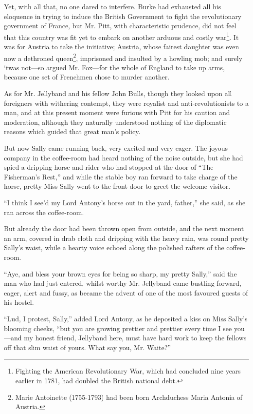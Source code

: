 \documentclass[paper=a5,BCOR=7mm,twoside,DIV=calc,12pt,usegeometry,chapterprefix,endperiod,headings=big]{scrbook}
\begin{document}
Yet, with all that, no one dared to interfere. Burke had exhausted all his eloquence in trying to induce the British Government to fight the revolutionary government of France, but Mr. Pitt, with characteristic prudence, did not feel that this country was fit yet to embark on another arduous and costly war\footnote{Fighting the American Revolutionary War, which had concluded nine years earlier in 1781, had doubled the British national debt.}. It was for Austria to take the initiative; Austria, whose fairest daughter was even now a dethroned queen\footnote{Marie Antoinette (1755-1793) had been born Archduchess Maria Antonia of Austria.}, imprisoned and insulted by a howling mob; and surely `twas not---so argued Mr. Fox---for the whole of England to take up arms, because one set of Frenchmen chose to murder another.

As for Mr. Jellyband and his fellow John Bulls, though they looked upon all foreigners with withering contempt, they were royalist and anti-revolutionists to a man, and at this present moment were furious with Pitt for his caution and moderation, although they naturally understood nothing of the diplomatic reasons which guided that great man's policy.

But now Sally came running back, very excited and very eager. The joyous company in the coffee-room had heard nothing of the noise outside, but she had spied a dripping horse and rider who had stopped at the door of \enquote{The Fisherman's Rest,} and while the stable boy ran forward to take charge of the horse, pretty Miss Sally went to the front door to greet the welcome visitor.

\enquote{I think I see'd my Lord Antony's horse out in the yard, father,} she said, as she ran across the coffee-room.

But already the door had been thrown open from outside, and the next moment an arm, covered in drab cloth and dripping with the heavy rain, was round pretty Sally's waist, while a hearty voice echoed along the polished rafters of the coffee-room.

\enquote{Aye, and bless your brown eyes for being so sharp, my pretty Sally,} said the man who had just entered, whilst worthy Mr. Jellyband came bustling forward, eager, alert and fussy, as became the advent of one of the most favoured guests of his hostel.

\enquote{Lud, I protest, Sally,} added Lord Antony, as he deposited a kiss on Miss Sally's blooming cheeks, \enquote{but you are growing prettier and prettier every time I see you---and my honest friend, Jellyband here, must have hard work to keep the fellows off that slim waist of yours. What say you, Mr. Waite?}
\end{document}
